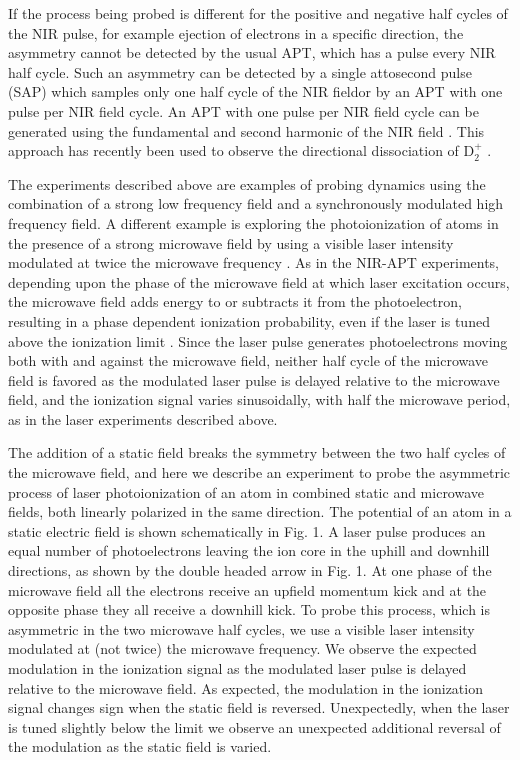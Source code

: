 \documentclass[aps,pra,preprint,groupedaddress]{revtex4-1}
\begin{document}
If the process being probed is different for the positive and negative half cycles of the NIR pulse, for example ejection of electrons in a specific direction, the asymmetry cannot be detected by the usual APT, which has a pulse every NIR half cycle. Such an asymmetry can be detected by a single attosecond pulse (SAP) which samples only one half cycle of the NIR fieldor by an APT with one pulse per NIR field cycle. An APT with one pulse per NIR field cycle can be generated using the fundamental and second harmonic of the NIR field \cite{Mauritsson}. This approach has recently been used to observe the directional dissociation of D$_2^+$ \cite{Singh}.


The experiments described above are examples of probing dynamics using the combination of a strong low frequency field and a synchronously modulated high frequency field. A different example is exploring the photoionization of atoms in the presence of a strong microwave field by using a visible laser intensity modulated at twice the microwave frequency \cite{Carrat}. As in the NIR-APT experiments, depending upon the phase of the microwave field at which laser excitation occurs, the microwave field adds energy to or subtracts it from the photoelectron, resulting in a phase dependent ionization probability, even if the laser is tuned above the ionization limit \cite{Shuman}. Since the laser pulse generates photoelectrons moving both with and against the microwave field, neither half cycle of the microwave field is favored as the modulated laser pulse is delayed relative to the microwave field, and the ionization signal varies sinusoidally, with half the microwave period, as in the laser experiments described above.


The addition of a static field breaks the symmetry between the two half cycles of the microwave field, and here we describe an experiment to probe the asymmetric process of laser photoionization of an atom in combined static and microwave fields, both linearly polarized in the same direction. The potential of an atom in a static electric field is shown schematically in Fig. 1. A laser pulse produces an equal number of photoelectrons leaving the ion core in the uphill and downhill directions, as shown by the double headed arrow in Fig. 1. At one phase of the microwave field all the electrons receive an upfield momentum kick and at the opposite phase they all receive a downhill kick. To probe this process, which is asymmetric in the two microwave half cycles, we use a visible laser intensity modulated at (not twice) the microwave frequency. We observe the expected modulation in the ionization signal as the modulated laser pulse is delayed relative to the microwave field. As expected, the modulation in the ionization signal changes sign when the static field is reversed. Unexpectedly, when the laser is tuned slightly below the limit we observe an unexpected additional reversal of the modulation as the static field is varied.
\end{document}
